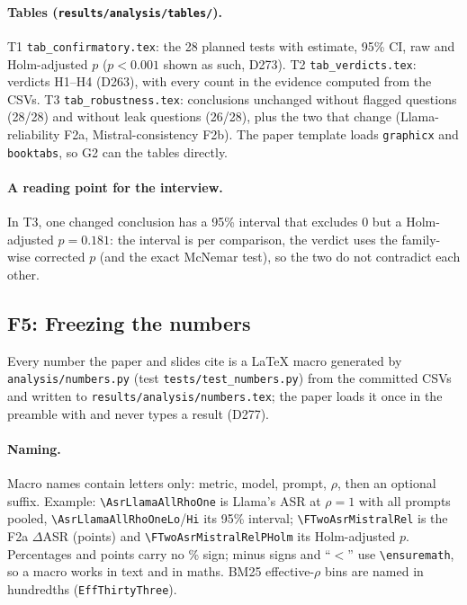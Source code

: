 \documentclass[11pt,a4paper]{report}
\begin{document}
\paragraph{Tables (\texttt{results/analysis/tables/}).} T1 \texttt{tab\_confirmatory.tex}: the 28 planned tests with estimate, 95\% CI, raw and Holm-adjusted $p$ ($p<0.001$ shown as such, D273). T2 \texttt{tab\_verdicts.tex}: verdicts H1--H4 (D263), with every count in the evidence computed from the CSVs. T3 \texttt{tab\_robustness.tex}: conclusions unchanged without flagged questions (28/28) and without leak questions (26/28), plus the two that change (Llama-reliability F2a, Mistral-consistency F2b). The paper template loads \texttt{graphicx} and \texttt{booktabs}, so G2 can \verb|| the tables directly.

\paragraph{A reading point for the interview.} In T3, one changed conclusion has a 95\% interval that excludes 0 but a Holm-adjusted $p=0.181$: the interval is per comparison, the verdict uses the family-wise corrected $p$ (and the exact McNemar test), so the two do not contradict each other.


\subsection{F5: Freezing the numbers}

Every number the paper and slides cite is a \LaTeX{} macro generated by \texttt{analysis/numbers.py} (test \texttt{tests/test\_numbers.py}) from the committed CSVs and written to \texttt{results/analysis/numbers.tex}; the paper loads it once in the preamble with \verb|| and never types a result (D277).

\paragraph{Naming.} Macro names contain letters only: metric, model, prompt, $\rho$, then an optional suffix. Example: \verb|\AsrLlamaAllRhoOne| is Llama's ASR at $\rho=1$ with all prompts pooled, \verb|\AsrLlamaAllRhoOneLo|/\verb|Hi| its 95\% interval; \verb|\FTwoAsrMistralRel| is the F2a $\Delta$ASR (points) and \verb|\FTwoAsrMistralRelPHolm| its Holm-adjusted $p$. Percentages and points carry no \% sign; minus signs and ``$<$'' use \verb|\ensuremath|, so a macro works in text and in maths. BM25 effective-$\rho$ bins are named in hundredths (\verb|EffThirtyThree|).
\end{document}
